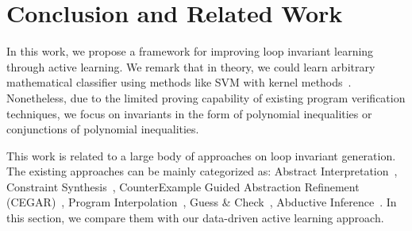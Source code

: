 
\section{Conclusion and Related Work} %
\label{sec:related}
In this work, we propose a framework for improving loop invariant learning through active learning. We remark that in theory, we could learn arbitrary mathematical classifier using methods like SVM with kernel methods~\cite{svm:kernel}. Nonetheless, due to the limited proving capability of existing program verification techniques, we focus on invariants in the form of polynomial inequalities or conjunctions of polynomial inequalities.


This work is related to a large body of approaches on loop invariant generation. 
The existing approaches can be mainly categorized as:
Abstract Interpretation~\cite{cousot1978automatic,mine2006octagon,cousot1979systematic,karr1976affine,vincent2009subpolyhedra},
Constraint Synthesis~\cite{ashutosh2009invgen,michael2003linear,sumit2009constraint},
CounterExample Guided Abstraction Refinement (CEGAR)~\cite{henzinger2003software,thomas2001slam,edmund2003counterexample},
Program Interpolation~\cite{kenneth2010lazy,thomas2004abstractions,kenneth2003interpolation,Kenneth2006lazy},
Guess \& Check~\cite{cormac2001houdini,ernst2007daikon},
Abductive Inference~\cite{isil2013inductive}.
In this section, we compare them with our data-driven active learning approach.

